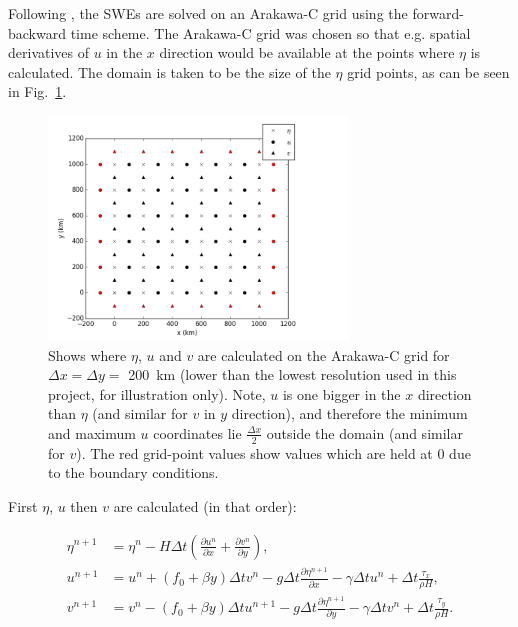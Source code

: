 \documentclass{article}
\begin{document}
Following \textcite{beckers1993stability}, the SWEs are solved on an Arakawa-C grid using the
forward-backward time scheme. The Arakawa-C grid was chosen so that e.g. spatial derivatives of $u$
in the $x$ direction would be available at the points where $\eta$ is calculated. The domain is
taken to be the size of the $\eta$ grid points, as can be seen in Fig.\ \ref{fig:arakawa_c_grid}.

\begin{figure}[ht!]
    \centering
    \includegraphics[width=300px]{figures/arakawa_c_grid}
    \caption{Shows where $\eta$, $u$ and $v$ are calculated on the Arakawa-C grid for $\Delta x =
	\Delta y =$ \SI{200}{km} (lower than the lowest resolution used in this project, for
	illustration only). Note, $u$ is one bigger in the $x$ direction than $\eta$ (and similar
	for $v$ in $y$ direction), and therefore the minimum and maximum $u$ coordinates lie
	$\frac{\Delta x}{2}$ outside the domain (and similar for $v$). The red grid-point values
	show values which are held at $0$ due to the boundary conditions. }
    \label{fig:arakawa_c_grid}
\end{figure}

First $\eta$, $u$ then $v$ are calculated (in that order):

\begin{align}
    \label{eqn:swe_arakawa1} 
    \eta^{n+1} & =  \eta^n- H \Delta t (\frac{\partial u^n}{\partial x} + \frac{\partial v^n}{\partial y} ),  \\
    \label{eqn:swe_arakawa2} 
    u^{n+1} & = u^n + (f_0 + \beta y) \Delta t v^n - g \Delta t \frac{\partial \eta^{n+1}}{\partial
    x} - \gamma \Delta t u^n + \Delta t \frac{\tau_x}{\rho H}, \\
    \label{eqn:swe_arakawa3} 
    v^{n+1} & = v^n - (f_0 + \beta y) \Delta t u^{n+1} - g \Delta t \frac{\partial \eta^{n+1}}{\partial y} -
    \gamma \Delta t v^n + \Delta t \frac{\tau_y}{\rho H}.
\end{align}
\end{document}
